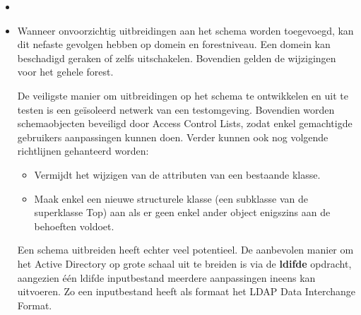 \documentclass{report}
\begin{document}
\begin{enumerate}
		 { 
			\begin{itemize}
				\item 
			\end{itemize}	
		}
		
		 { }
		
		 { 
			\begin{itemize}
				\item Wanneer onvoorzichtig uitbreidingen aan het schema worden toegevoegd, kan dit nefaste gevolgen hebben op domein en forestniveau. Een domein kan beschadigd geraken of zelfs uitschakelen. Bovendien gelden de wijzigingen voor het gehele forest.
				
				De veiligste manier om uitbreidingen op het schema te ontwikkelen en uit te testen is een geïsoleerd netwerk van een testomgeving. Bovendien worden schemaobjecten beveiligd door Access Control Lists, zodat enkel gemachtigde gebruikers aanpassingen kunnen doen. Verder kunnen ook nog volgende richtlijnen gehanteerd worden:
				\begin{itemize}
					\item Vermijdt het wijzigen van de attributen van een bestaande klasse.
					\item Maak enkel een nieuwe structurele klasse (een subklasse van de superklasse Top) aan als er geen enkel ander object enigszins aan de behoeften voldoet.
				\end{itemize}
				
				Een schema uitbreiden heeft echter veel potentieel. De aanbevolen manier om het Active Directory op grote schaal uit te breiden is via de \textbf{ldifde} opdracht, aangezien één ldifde inputbestand meerdere aanpassingen ineens kan uitvoeren. Zo een inputbestand heeft als formaat het LDAP Data Interchange Format.
			\end{itemize}
		}
	\end{enumerate}
	
\end{document}
